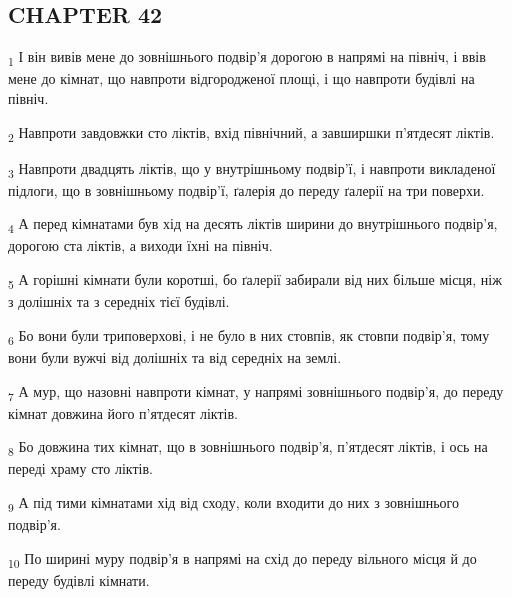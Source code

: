 \subsection{CHAPTER 42}
\begin{tcolorbox}
\textsubscript{1} І він вивів мене до зовнішнього подвір'я дорогою в напрямі на північ, і ввів мене до кімнат, що навпроти відгородженої площі, і що навпроти будівлі на північ.
\end{tcolorbox}
\begin{tcolorbox}
\textsubscript{2} Навпроти завдовжки сто ліктів, вхід північний, а завширшки п'ятдесят ліктів.
\end{tcolorbox}
\begin{tcolorbox}
\textsubscript{3} Навпроти двадцять ліктів, що у внутрішньому подвір'ї, і навпроти викладеної підлоги, що в зовнішньому подвір'ї, ґалерія до переду ґалерії на три поверхи.
\end{tcolorbox}
\begin{tcolorbox}
\textsubscript{4} А перед кімнатами був хід на десять ліктів ширини до внутрішнього подвір'я, дорогою ста ліктів, а виходи їхні на північ.
\end{tcolorbox}
\begin{tcolorbox}
\textsubscript{5} А горішні кімнати були коротші, бо ґалерії забирали від них більше місця, ніж з долішніх та з середніх тієї будівлі.
\end{tcolorbox}
\begin{tcolorbox}
\textsubscript{6} Бо вони були триповерхові, і не було в них стовпів, як стовпи подвір'я, тому вони були вужчі від долішніх та від середніх на землі.
\end{tcolorbox}
\begin{tcolorbox}
\textsubscript{7} А мур, що назовні навпроти кімнат, у напрямі зовнішнього подвір'я, до переду кімнат довжина його п'ятдесят ліктів.
\end{tcolorbox}
\begin{tcolorbox}
\textsubscript{8} Бо довжина тих кімнат, що в зовнішнього подвір'я, п'ятдесят ліктів, і ось на переді храму сто ліктів.
\end{tcolorbox}
\begin{tcolorbox}
\textsubscript{9} А під тими кімнатами хід від сходу, коли входити до них з зовнішнього подвір'я.
\end{tcolorbox}
\begin{tcolorbox}
\textsubscript{10} По ширині муру подвір'я в напрямі на схід до переду вільного місця й до переду будівлі кімнати.
\end{tcolorbox}
